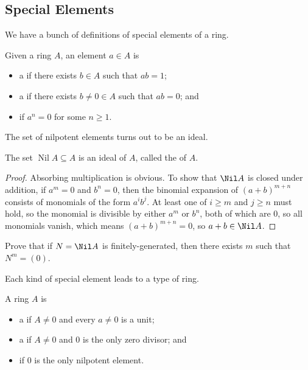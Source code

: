 \subsection{Special Elements}
We have a bunch of definitions of
special elements of a ring.
\begin{definition}
    Given a ring $A$, an element $a\in A$ is
    \begin{itemize}
    \item a  if there exists $b\in A$ such that $ab=1$;
    \item a  if
	there exists $b\neq 0\in A$ such that $ab=0$; and
    \item {} if $a^n=0$ for some $n\geq 1$.
    \end{itemize}
\end{definition}
The set of nilpotent elements turns out to be an ideal.
\begin{proposition}
    The set $\operatorname{Nil}A\subseteq A$
    is an ideal of $A$, called the 
    of $A$.
\end{proposition}
\begin{proof}
    Absorbing multiplication is obvious.
    To show that $\Nil A$ is closed under addition,
    if $a^m=0$ and $b^n=0$, then the binomial expansion of $(a+b)^{m+n}$ 
    consists of monomials of the form $a^ib^j$.
    At least one of $i\geq m$ and $j\geq n$ must hold,
    so the monomial is divisible by either $a^m$ or $b^n$,
    both of which are $0$, so all monomials vanish,
    which means $(a+b)^{m+n}=0$, so $a+b\in \Nil A$.
\end{proof}
\begin{exercise}
\label{ex:nilradical_fg}
Prove that if $N = \Nil A$ is finitely-generated, then 
there exists $m$ such that $N^m = (0)$.
\end{exercise}
Each kind of special element leads to a type of ring.
\begin{definition}
    A ring $A$ is
    \begin{itemize}
    \item a  if $A\neq 0$ and every $a\neq 0$ is a unit;
    \item a  if $A\neq 0$ and $0$ is the only zero divisor; and
    \item {} if $0$ is the only nilpotent element.
    \end{itemize}
\end{definition}
